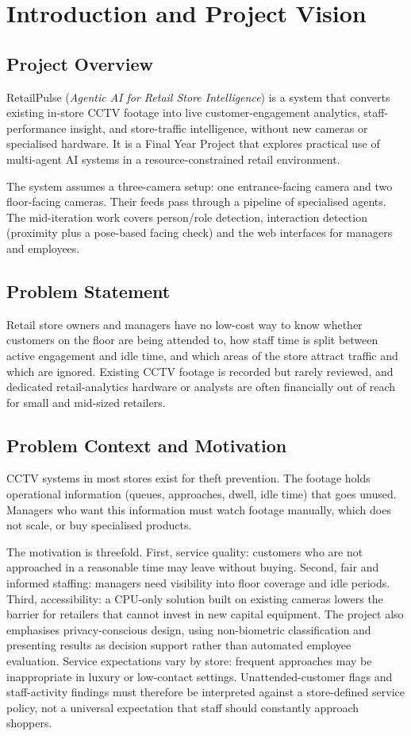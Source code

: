 \chapter{Introduction and Project Vision}
\label{ch:intro}
\section{Project Overview}
RetailPulse (\textit{Agentic AI for Retail Store Intelligence}) is a system that converts existing in-store CCTV footage into live customer-engagement analytics, staff-performance insight, and store-traffic intelligence, without new cameras or specialised hardware. It is a Final Year Project that explores practical use of multi-agent AI systems in a resource-constrained retail environment.

The system assumes a three-camera setup: one entrance-facing camera and two floor-facing cameras. Their feeds pass through a pipeline of specialised agents. The mid-iteration work covers person/role detection, interaction detection (proximity plus a pose-based facing check) and the web interfaces for managers and employees.

\section{Problem Statement}
Retail store owners and managers have no low-cost way to know whether customers on the floor are being attended to, how staff time is split between active engagement and idle time, and which areas of the store attract traffic and which are ignored. Existing CCTV footage is recorded but rarely reviewed, and dedicated retail-analytics hardware or analysts are often financially out of reach for small and mid-sized retailers.

\section{Problem Context and Motivation}
CCTV systems in most stores exist for theft prevention. The footage holds operational information (queues, approaches, dwell, idle time) that goes unused. Managers who want this information must watch footage manually, which does not scale, or buy specialised products.

The motivation is threefold. First, service quality: customers who are not approached in a reasonable time may leave without buying. Second, fair and informed staffing: managers need visibility into floor coverage and idle periods. Third, accessibility: a CPU-only solution built on existing cameras lowers the barrier for retailers that cannot invest in new capital equipment. The project also emphasises privacy-conscious design, using non-biometric classification and presenting results as decision support rather than automated employee evaluation. Service expectations vary by store: frequent approaches may be inappropriate in luxury or low-contact settings. Unattended-customer flags and staff-activity findings must therefore be interpreted against a store-defined service policy, not a universal expectation that staff should constantly approach shoppers.

